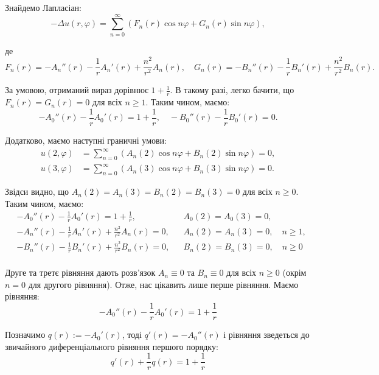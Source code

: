 \documentclass{hw_template}
\begin{document}
Знайдемо Лапласіан:
\begin{equation*}
    -\Delta u(r,\varphi) = \sum_{n=0}^{\infty}(F_n(r)\cos n\varphi + G_n(r)\sin n\varphi),
\end{equation*}

де 
\begin{equation*}
    F_n(r) = -A_n''(r)-\frac{1}{r}A_n'(r)+\frac{n^2}{r^2}A_n(r), \quad G_n(r) = -B_n''(r)-\frac{1}{r}B_n'(r)+\frac{n^2}{r^2}B_n(r).
\end{equation*}

За умовою, отриманий вираз дорівнює $1+\frac{1}{r}$. В такому разі, легко бачити, що $F_n(r)=G_n(r)=0$ для всіх $n \geq 1$. Таким чином, маємо:
\begin{equation*}
    -A_0''(r)-\frac{1}{r}A_0'(r) = 1 + \frac{1}{r}, \quad -B_0''(r) - \frac{1}{r}B_0'(r) = 0.
\end{equation*} 

Додатково, маємо наступні граничні умови:
\begin{align*}
    u(2,\varphi) &= \sum_{n=0}^{\infty}(A_n(2)\cos n\varphi + B_n(2)\sin n\varphi) = 0, \\
    u(3,\varphi) &= \sum_{n=0}^{\infty}(A_n(3)\cos n\varphi + B_n(3)\sin n\varphi) = 0.
\end{align*}

Звідси видно, що $A_n(2) = A_n(3) = B_n(2) = B_n(3) = 0$ для всіх $n \geq 0$. Таким чином, маємо:
\begin{align*}
    &-A_0''(r)-\frac{1}{r}A_0'(r) = 1 + \frac{1}{r}, && A_0(2) = A_0(3) = 0, \\
    &-A_n''(r) - \frac{1}{r}A_n'(r)+\frac{n^2}{r^2}A_n(r) = 0, && A_n(2) = A_n(3) = 0, \quad n \geq 1, \\
    &-B_n''(r) - \frac{1}{r}B_n'(r)+\frac{n^2}{r^2}B_n(r) = 0, && B_n(2) = B_n(3) = 0, \quad n \geq 0 \\
\end{align*}

Друге та третє рівняння дають розв'язок $A_n \equiv 0$ та $B_n \equiv 0$ для
всіх $n \geq 0$ (окрім $n=0$ для другого рівняння). Отже, нас цікавить лише 
перше рівняння. Маємо рівняння:
\begin{equation*}
    -A_0''(r)-\frac{1}{r}A_0'(r) = 1 + \frac{1}{r}
\end{equation*}

Позначимо $q(r) := -A_0'(r)$, тоді $q'(r)=-A_0''(r)$ і рівняння зведеться 
до звичайного диференціального рівняння першого порядку:
\begin{equation*}
    q'(r) + \frac{1}{r}q(r) = 1 + \frac{1}{r} 
\end{equation*}
\end{document}
